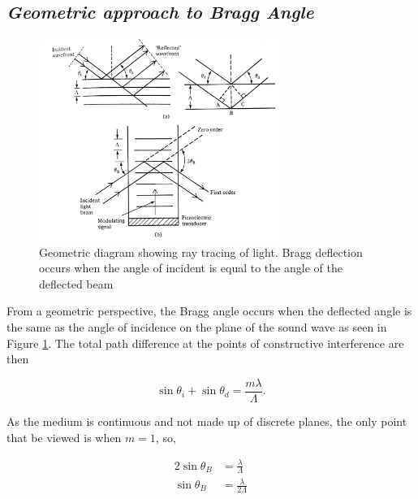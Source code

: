 \documentclass[aps,prl,reprint,10pt,amsmath,amssymb,superscriptaddress,a4paper]{revtex4-2}
\begin{document}
\subsection{\normalfont\textit{Geometric approach to Bragg Angle}}
\begin{figure}
    \includegraphics[width=8cm]{../Figures/braggangle.png}
    \caption{Geometric diagram showing ray tracing of light. Bragg deflection occurs when the angle of incident is equal to the angle of the deflected beam}
    \label{fig:geometricproof}
\end{figure}

From a geometric perspective, the Bragg angle occurs when the deflected angle is the same as the angle of incidence on the plane of the sound wave as seen in Figure 
\ref{fig:geometricproof}. The total path difference at the points of constructive interference are then 

\begin{equation}
    \sin{\theta_i} + \sin{\theta_d} = \frac{m\lambda}{\Lambda}.
\end{equation}

As the medium is continuous and not made up of discrete planes, the only point that be viewed is when $m = 1$, so,

\begin{align*}
    2\sin{\theta_B} &= \frac{\lambda}{\Lambda} \\
    \sin{\theta_B} &= \frac{\lambda}{2\Lambda}
\end{align*}
\end{document}
